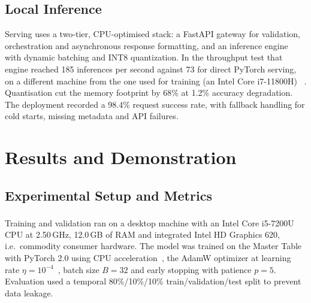 \documentclass[]{ceurart}
\begin{document}
\subsection{Local Inference}
Serving uses a two-tier, CPU-optimised stack: a FastAPI gateway for validation,
orchestration and asynchronous response formatting, and an inference engine with
dynamic batching and INT8 quantization. In the throughput test that engine
reached 185 inferences per second against 73 for direct PyTorch serving, on a
different machine from the one used for training (an Intel Core i7-11800H)
~\cite{paszke2019pytorch,jacob2018quantization}. Quantisation cut the memory
footprint by 68\% at 1.2\% accuracy degradation. The deployment recorded a 98.4\%
request success rate, with fallback handling for cold starts, missing metadata
and API failures.


\section{Results and Demonstration}
\label{sec:results}

\subsection{Experimental Setup and Metrics}
Training and validation ran on a desktop machine with an
Intel\textsuperscript{\textregistered} Core\texttrademark{} i5-7200U CPU at
2.50\,GHz, 12.0\,GB of RAM and integrated Intel HD Graphics 620, i.e.\ commodity
consumer hardware. The model was trained on the Master Table with PyTorch 2.0
using CPU acceleration~\cite{paszke2019pytorch}, the AdamW optimizer at learning
rate $\eta=10^{-4}$~\cite{loshchilov2019decoupled}, batch size $B=32$ and early
stopping with patience $p=5$. Evaluation used a temporal 80\%/10\%/10\%
train/validation/test split to prevent data leakage.
\end{document}
